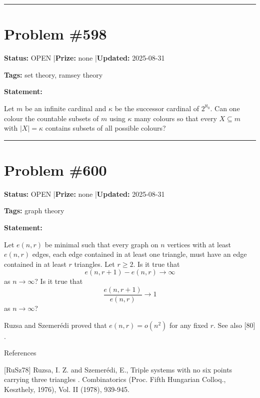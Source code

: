 \documentclass{article}
\begin{document}
\noindent\rule{\linewidth}{0.4pt}


\section{Problem \#598}
\label{prob:598}

\noindent\textbf{Status:} OPEN \quad|\quad \textbf{Prize:} none \quad|\quad \textbf{Updated:} 2025-08-31

\noindent\textbf{Tags:} set theory, ramsey theory

\medskip

\noindent\textbf{Statement:}

Let $m$ be an infinite cardinal and $\kappa$ be the successor cardinal of $2^{\aleph_0}$. Can one colour the countable subsets of $m$ using $\kappa$ many colours so that every $X\subseteq m$ with $\lvert X\rvert=\kappa$ contains subsets of all possible colours?

\noindent\rule{\linewidth}{0.4pt}


\section{Problem \#600}
\label{prob:600}

\noindent\textbf{Status:} OPEN \quad|\quad \textbf{Prize:} none \quad|\quad \textbf{Updated:} 2025-08-31

\noindent\textbf{Tags:} graph theory

\medskip

\noindent\textbf{Statement:}

Let $e(n,r)$ be minimal such that every graph on $n$ vertices with at least $e(n,r)$ edges, each edge contained in at least one triangle, must have an edge contained in at least $r$ triangles. Let $r\geq 2$. Is it true that\[e(n,r+1)-e(n,r)\to \infty\]as $n\to \infty$? Is it true that\[\frac{e(n,r+1)}{e(n,r)}\to 1\]as $n\to \infty$?




Ruzsa and Szemer\'{e}di \cite{RuSz78} proved that $e(n,r)=o(n^2)$ for any fixed $r$. See also [80] .




References

[RuSz78] Ruzsa, I. Z. and Szemer\'{e}di, E., Triple systems with no six points carrying three triangles . Combinatorics (Proc. Fifth Hungarian Colloq., Keszthely, 1976), Vol. II (1978), 939-945.
\end{document}
